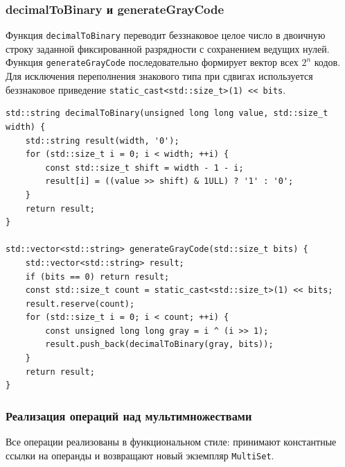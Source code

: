 \documentclass[14pt]{extreport}
\begin{document}
{\subsubsection{decimalToBinary и generateGrayCode}}
Функция \texttt{decimalToBinary} переводит беззнаковое целое число в двоичную строку заданной фиксированной разрядности с сохранением ведущих нулей. Функция \texttt{generateGrayCode} последовательно формирует вектор всех $2^n$ кодов. Для исключения переполнения знакового типа при сдвигах используется беззнаковое приведение \texttt{static\_cast<std::size\_t>(1) << bits}.

\begin{lstlisting}[caption={Генерация кодов Грея}, label={lst:gray}]
std::string decimalToBinary(unsigned long long value, std::size_t width) {
    std::string result(width, '0');
    for (std::size_t i = 0; i < width; ++i) {
        const std::size_t shift = width - 1 - i;
        result[i] = ((value >> shift) & 1ULL) ? '1' : '0';
    }
    return result;
}

std::vector<std::string> generateGrayCode(std::size_t bits) {
    std::vector<std::string> result;
    if (bits == 0) return result;
    const std::size_t count = static_cast<std::size_t>(1) << bits;
    result.reserve(count);
    for (std::size_t i = 0; i < count; ++i) {
        const unsigned long long gray = i ^ (i >> 1);
        result.push_back(decimalToBinary(gray, bits));
    }
    return result;
}
\end{lstlisting}

{\subsubsection{Реализация операций над мультимножествами}}
Все операции реализованы в функциональном стиле: принимают константные ссылки на операнды и возвращают новый экземпляр \texttt{MultiSet}.
\end{document}
